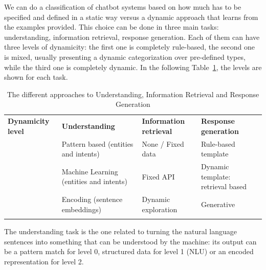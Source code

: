 We can do a classification of chatbot systems based on how much has to be specified and defined in a static way versus a dynamic approach that learns from the examples provided. This choice can be done in three main tasks: understanding, information retrieval, response generation. Each of them can have three levels of dynamicity: the first one is completely rule-based, the second one is mixed, usually presenting a dynamic categorization over pre-defined types, while the third one is completely dynamic. In the following Table~\ref{tab:approachCombination}, the levels are shown for each task.


\begin{table}[H]
 			\centering
\begin{tabular}{p{0.79in}p{1.91in}p{1.12in}p{1.64in}}
\hline
\multicolumn{1}{|p{0.79in}}{\textbf{Dynamicity level}} & 
\multicolumn{1}{|p{1.91in}}{\textbf{Understanding }} & 
\multicolumn{1}{|p{1.12in}}{\textbf{Information retrieval}} & 
\multicolumn{1}{|p{1.64in}|}{\textbf{Response generation}} \\
\hhline{----}
\multicolumn{1}{|p{0.79in}}{0} & 
\multicolumn{1}{|p{1.91in}}{Pattern based (entities and intents)} & 
\multicolumn{1}{|p{1.12in}}{None / Fixed data} & 
\multicolumn{1}{|p{1.64in}|}{Rule-based template} \\
\hhline{----}
\multicolumn{1}{|p{0.79in}}{1} & 
\multicolumn{1}{|p{1.91in}}{Machine Learning (entities and intents)} & 
\multicolumn{1}{|p{1.12in}}{Fixed API} & 
\multicolumn{1}{|p{1.64in}|}{Dynamic template: retrieval based} \\
\hhline{----}
\multicolumn{1}{|p{0.79in}}{2} & 
\multicolumn{1}{|p{1.91in}}{Encoding (sentence embeddings)} & 
\multicolumn{1}{|p{1.12in}}{Dynamic exploration} & 
\multicolumn{1}{|p{1.64in}|}{Generative} \\
\hhline{----}

\end{tabular}
 \caption{The different approaches to Understanding, Information Retrieval and Response Generation}\label{tab:approachCombination}
\end{table}
%

The understanding task is the one related to turning the natural language sentences into something that can be understood by the machine: its output can be a pattern match for level 0, structured data for level 1 (NLU) or an encoded representation for level 2. 

